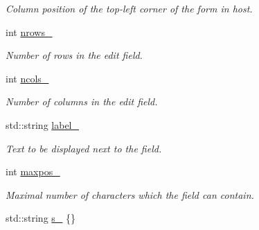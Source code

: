 \begin{DoxyCompactItemize}
\begin{DoxyCompactList}\small\item\em Column position of the top-\/left corner of the form in {\ttfamily host}. \end{DoxyCompactList}\item 
int \hyperlink{structslb_1_1core_1_1ui_1_1EditField_a0cf8d62cd3699e057656f71c3e95ffda}{nrows\+\_\+}\hypertarget{structslb_1_1core_1_1ui_1_1EditField_a0cf8d62cd3699e057656f71c3e95ffda}{}\label{structslb_1_1core_1_1ui_1_1EditField_a0cf8d62cd3699e057656f71c3e95ffda}

\begin{DoxyCompactList}\small\item\em Number of rows in the edit field. \end{DoxyCompactList}\item 
int \hyperlink{structslb_1_1core_1_1ui_1_1EditField_a31f8b02f9fe179c3d738cc653ebf101f}{ncols\+\_\+}\hypertarget{structslb_1_1core_1_1ui_1_1EditField_a31f8b02f9fe179c3d738cc653ebf101f}{}\label{structslb_1_1core_1_1ui_1_1EditField_a31f8b02f9fe179c3d738cc653ebf101f}

\begin{DoxyCompactList}\small\item\em Number of columns in the edit field. \end{DoxyCompactList}\item 
std\+::string \hyperlink{structslb_1_1core_1_1ui_1_1EditField_a640267ccc2fd8491717bf0628a635cf1}{label\+\_\+}\hypertarget{structslb_1_1core_1_1ui_1_1EditField_a640267ccc2fd8491717bf0628a635cf1}{}\label{structslb_1_1core_1_1ui_1_1EditField_a640267ccc2fd8491717bf0628a635cf1}

\begin{DoxyCompactList}\small\item\em Text to be displayed next to the field. \end{DoxyCompactList}\item 
int \hyperlink{structslb_1_1core_1_1ui_1_1EditField_a5468afc21f6ee5cbda5cbab07b364719}{maxpos\+\_\+}\hypertarget{structslb_1_1core_1_1ui_1_1EditField_a5468afc21f6ee5cbda5cbab07b364719}{}\label{structslb_1_1core_1_1ui_1_1EditField_a5468afc21f6ee5cbda5cbab07b364719}

\begin{DoxyCompactList}\small\item\em Maximal number of characters which the field can contain. \end{DoxyCompactList}\item 
std\+::string \hyperlink{structslb_1_1core_1_1ui_1_1EditField_ad32540b88b76c20cc0292992d46ef369}{s\+\_\+} \{\}\hypertarget{structslb_1_1core_1_1ui_1_1EditField_ad32540b88b76c20cc0292992d46ef369}{}\label{structslb_1_1core_1_1ui_1_1EditField_ad32540b88b76c20cc0292992d46ef369}


\end{DoxyCompactItemize}
